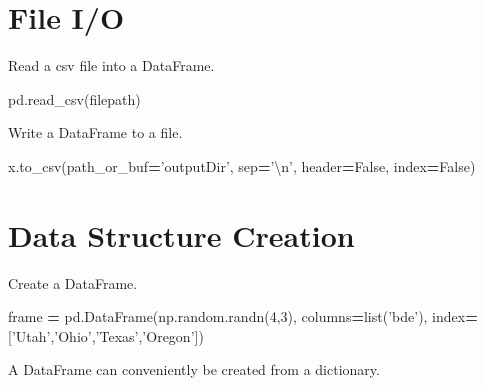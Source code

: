 \documentclass[]{book}
\newenvironment{Shaded}{\begin{snugshade}}{\end{snugshade}}
\newcommand{\DecValTok}[1]{\textcolor[rgb]{0.00,0.00,0.81}{#1}}
\newcommand{\CharTok}[1]{\textcolor[rgb]{0.31,0.60,0.02}{#1}}
\newcommand{\StringTok}[1]{\textcolor[rgb]{0.31,0.60,0.02}{#1}}
\newcommand{\VariableTok}[1]{\textcolor[rgb]{0.00,0.00,0.00}{#1}}
\newcommand{\OperatorTok}[1]{\textcolor[rgb]{0.81,0.36,0.00}{\textbf{#1}}}
\newcommand{\BuiltInTok}[1]{#1}
\newcommand{\NormalTok}[1]{#1}
\begin{document}
\section{File I/O}\label{file-io}

Read a csv file into a DataFrame.

\begin{Shaded}
\begin{Highlighting}[]
\NormalTok{pd.read_csv(filepath)}
\end{Highlighting}
\end{Shaded}

Write a DataFrame to a file.

\begin{Shaded}
\begin{Highlighting}[]
\NormalTok{x.to_csv(path_or_buf}\OperatorTok{=}\StringTok{'outputDir'}\NormalTok{, sep}\OperatorTok{=}\StringTok{'}\CharTok{\textbackslash{}n}\StringTok{'}\NormalTok{, header}\OperatorTok{=}\VariableTok{False}\NormalTok{, index}\OperatorTok{=}\VariableTok{False}\NormalTok{)}
\end{Highlighting}
\end{Shaded}

\section{Data Structure Creation}\label{data-structure-creation}

Create a DataFrame.

\begin{Shaded}
\begin{Highlighting}[]
\NormalTok{frame }\OperatorTok{=}\NormalTok{ pd.DataFrame(np.random.randn(}\DecValTok{4}\NormalTok{,}\DecValTok{3}\NormalTok{), columns}\OperatorTok{=}\BuiltInTok{list}\NormalTok{(}\StringTok{'bde'}\NormalTok{), index}\OperatorTok{=}\NormalTok{[}\StringTok{'Utah'}\NormalTok{,}\StringTok{'Ohio'}\NormalTok{,}\StringTok{'Texas'}\NormalTok{,}\StringTok{'Oregon'}\NormalTok{])}
\end{Highlighting}
\end{Shaded}

A DataFrame can conveniently be created from a dictionary.
\end{document}
